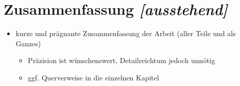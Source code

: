 \documentclass[../main/thesis.tex]{subfiles}
\begin{document}
\chapter{Zusammenfassung \emph{[ausstehend]}}

\begin{itemize}
	\item kurze und prägnante Zusammenfassung der Arbeit (aller Teile und als Ganzes)
	\begin{itemize}
		\item Präzision ist wünschenswert, Detailreichtum jedoch unnötig
		\item ggf. Querverweise in die einzelnen Kapitel
	\end{itemize}
\end{itemize}



\end{document}

